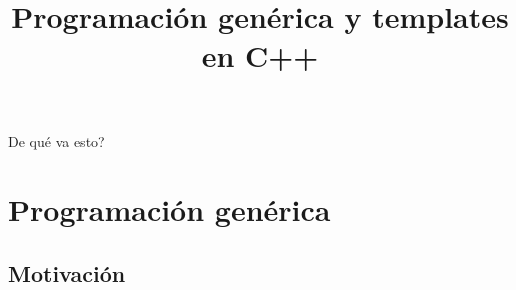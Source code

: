 

\title%
{Programaci\'on gen\'erica y templates en C++}

\subject{Programaci\'on gen\'erica y templates en C++}



\begin{frame}
   \titlepage
\end{frame}

\begin{frame}{De qu\'e va esto?}
   \tableofcontents
\end{frame}


\section{Programaci\'on gen\'erica}
\subsection{Motivaci\'on}

